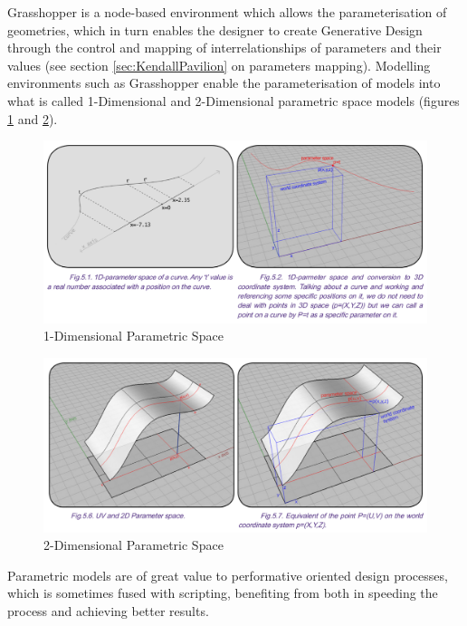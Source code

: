 Grasshopper is a node-based environment which allows the parameterisation of geometries, which in turn enables the designer to create Generative Design through the control and mapping of interrelationships of parameters and their values (see section \ref{sec:KendallPavilion} on parameters mapping). Modelling environments such as Grasshopper enable the parameterisation of models into what is called 1-Dimensional and 2-Dimensional parametric space models (figures \ref{fig:1DSpace} and \ref{fig:2DSpace}).

\begin{figure}[t]
	\centering
	\includegraphics[width=\textwidth]{./Images/21-1DSpace}
	\caption[1-Dimensional Parametric Space]{1-Dimensional Parametric Space \cite{khazabi12}}
	\label{fig:1DSpace}
\end{figure}

\begin{figure}[htbp]
	\centering
	\includegraphics[width=\textwidth]{./Images/22-2DSpace}
	\caption[2-Dimensional Parametric Space]{2-Dimensional Parametric Space \cite{khazabi12}}
	\label{fig:2DSpace}
\end{figure}

Parametric models are of great value to performative oriented design processes, which is sometimes fused with scripting, benefiting from both in speeding the process and achieving better results.

